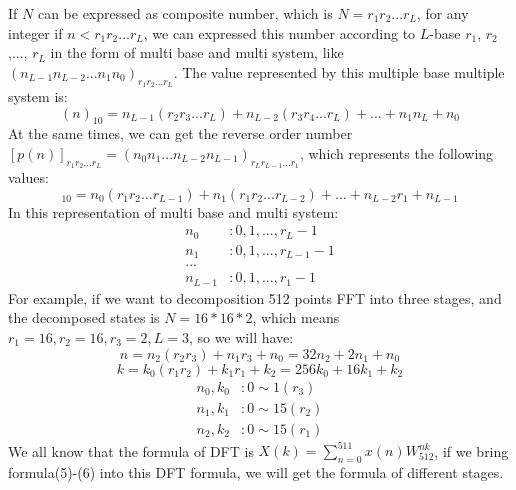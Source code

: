 \documentclass[journal]{IEEEtran}
\begin{document}
If $N$ can be expressed as composite number, which is $N=r_1r_2...r_L$, for any integer if $n<r_1r_2...r_L$, we can
expressed this number according to $L$-base $r_1$, $r_2$,..., $r_L$ in the form of multi base and multi system, like $(n_{L-1}n_{L-2}...n_{1}n_{0})_{r_1r_2...r_L}$. The value represented by this multiple base multiple
system is:
\begin{equation}
    (n)_{10} = n_{L-1}(r_2r_3...r_L) +
             n_{L-2}(r_3r_4...r_L) +
             ... +
             n_1n_L +
             n_0
\end{equation}
At the same times, we can get the reverse order number
$[p(n)]_{r_1r_2...r_{L}} = (n_0n_1...n_{L-2}n_{L-1})_{r_Lr_{L-1}...r_1}$, which represents the following values:
\begin{equation}
    [p(n)]_{10} = n_0(r_1r_2...r_{L-1}) +
                  n_1(r_1r_2...r_{L-2}) +
                  ... +
                  n_{L-2}r_1 +
                  n_{L-1}
\end{equation}
In this representation of multi base and multi system:
\begin{equation}
\begin{aligned}
  n_0 &: 0, 1, ..., r_L-1 \\
  n_1 &: 0, 1, ..., r_{L-1}-1 \\
  ... \\
  n_{L-1} &: 0, 1, ..., r_1-1
\end{aligned}
\end{equation}
For example, if we want to decomposition 512 points FFT into three stages, and the decomposed states
is $N=16*16*2$, which means $r_1=16, r_2=16, r_3=2, L=3$, so we will have:
\begin{equation}
    n = n_2(r_2r_3) + n_1r_3 + n_0 = 32n_2 + 2n_1 + n_0
\end{equation}
\begin{equation}
    k = k_0(r_1r_2) + k_1r_1 + k_2 = 256k_0 + 16k_1 + k_2
\end{equation}
\begin{equation}
\begin{aligned}
  n_0,k_0 &: 0 \sim 1 (r_3) \\
  n_1,k_1 &: 0 \sim 15 (r_2) \\
  n_2,k_2 &: 0 \sim 15 (r_1)
\end{aligned}
\end{equation}
We all know that the formula of DFT is $X(k) = \sum\limits_{n=0}^{511}x(n)W_{512}^{nk}$,
if we bring formula(5)-(6) into this DFT formula, we will get the formula of different stages.
\end{document}

